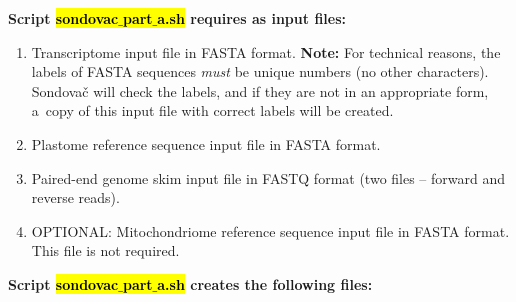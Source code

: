 \documentclass[a4paper, 11pt, twoside]{article}
\renewcommand{\texttt}[1]{\hl{\ttfamily #1}}
\begin{document}
\vspace{10pt}
\textbf{Script \texttt{sondovac$\_$part$\_$a.sh} requires as input files:}

\begin{enumerate}
  \item Transcriptome input file in FASTA format. \textbf{Note:} For technical reasons, the labels of FASTA sequences \textit{must} be unique numbers (no other characters). Sondovač will check the labels, and if they are not in an appropriate form, a~copy of this input file with correct labels will be created.
  \item Plastome reference sequence input file in FASTA format.
  \item Paired-end genome skim input file in FASTQ format (two files -- forward and reverse reads).
  \item OPTIONAL: Mitochondriome reference sequence input file in FASTA format. This file is not required.
\end{enumerate}

\textbf{Script \texttt{sondovac$\_$part$\_$a.sh} creates the following files:}
\end{document}

